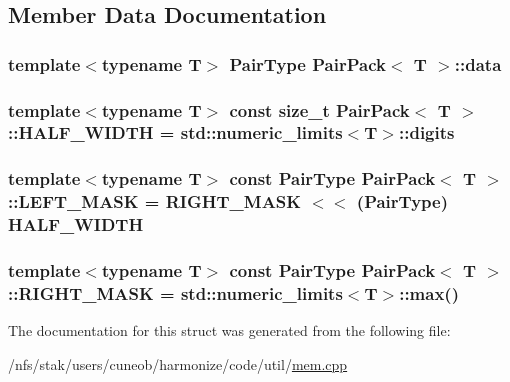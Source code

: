 \subsection{Member Data Documentation}
\hypertarget{structPairPack_a9ce2994d26fae9c01124ef4ecc9db90e}{
\subsubsection[{data}]{\setlength{\rightskip}{0pt plus 5cm}template$<$typename T$>$ {\bf Pair\-Type} {\bf Pair\-Pack}$<$ T $>$\-::data}}\label{structPairPack_a9ce2994d26fae9c01124ef4ecc9db90e}
\hypertarget{structPairPack_a75dce9fb9be36ef071cffa2ba07d9800}{
\subsubsection[{H\-A\-L\-F\-\_\-\-W\-I\-D\-T\-H}]{\setlength{\rightskip}{0pt plus 5cm}template$<$typename T$>$ const size\-\_\-t {\bf Pair\-Pack}$<$ T $>$\-::H\-A\-L\-F\-\_\-\-W\-I\-D\-T\-H = std\-::numeric\-\_\-limits$<$T$>$\-::digits\hspace{0.3cm}{\ttfamily [static]}}}\label{structPairPack_a75dce9fb9be36ef071cffa2ba07d9800}
\hypertarget{structPairPack_a8fcce8c8a751f7b2a24b02afae40bfe0}{
\subsubsection[{L\-E\-F\-T\-\_\-\-M\-A\-S\-K}]{\setlength{\rightskip}{0pt plus 5cm}template$<$typename T$>$ const {\bf Pair\-Type} {\bf Pair\-Pack}$<$ T $>$\-::L\-E\-F\-T\-\_\-\-M\-A\-S\-K = {\bf R\-I\-G\-H\-T\-\_\-\-M\-A\-S\-K} $<$$<$ ({\bf Pair\-Type}) {\bf H\-A\-L\-F\-\_\-\-W\-I\-D\-T\-H}\hspace{0.3cm}{\ttfamily [static]}}}\label{structPairPack_a8fcce8c8a751f7b2a24b02afae40bfe0}
\hypertarget{structPairPack_a214b8ee29343fc0ff8f99f5720133346}{
\subsubsection[{R\-I\-G\-H\-T\-\_\-\-M\-A\-S\-K}]{\setlength{\rightskip}{0pt plus 5cm}template$<$typename T$>$ const {\bf Pair\-Type} {\bf Pair\-Pack}$<$ T $>$\-::R\-I\-G\-H\-T\-\_\-\-M\-A\-S\-K = std\-::numeric\-\_\-limits$<$T$>$\-::max()\hspace{0.3cm}{\ttfamily [static]}}}\label{structPairPack_a214b8ee29343fc0ff8f99f5720133346}


The documentation for this struct was generated from the following file\-:\begin{DoxyCompactItemize}
\item 
/nfs/stak/users/cuneob/harmonize/code/util/\hyperlink{mem_8cpp}{mem.\-cpp}\end{DoxyCompactItemize}
